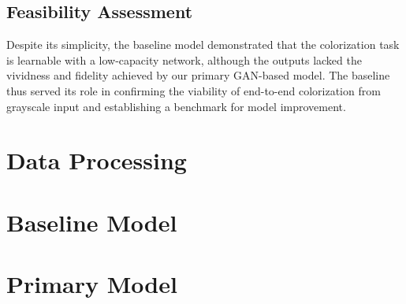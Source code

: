 \documentclass{article} %
\begin{document}
\subsection{Feasibility Assessment}

Despite its simplicity, the baseline model demonstrated that the colorization task is learnable with a low-capacity network, although the outputs lacked the vividness and fidelity 
achieved by our primary GAN-based model. The baseline thus served its role in confirming the viability of end-to-end colorization from grayscale input and establishing a benchmark 
for model improvement.

\section{Data Processing}

\section{Baseline Model}

\section{Primary Model}
\label{last_page}

\newpage


\end{document}
